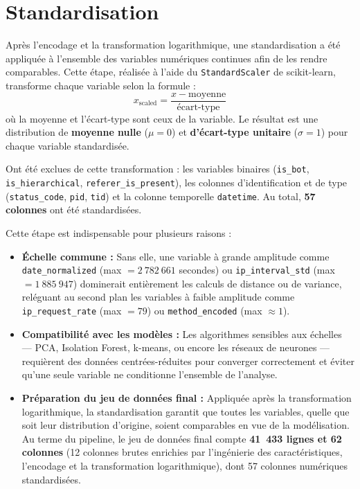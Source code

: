 \documentclass[a4paper,12pt]{article}
\begin{document}
\section{Standardisation}
\label{sec:standardisation}

Après l'encodage et la transformation logarithmique, une standardisation a été appliquée à l'ensemble des variables numériques continues afin de les rendre comparables. Cette étape, réalisée à l'aide du \texttt{StandardScaler} de scikit-learn, transforme chaque variable selon la formule :
\begin{equation}
  x_{\text{scaled}} = \frac{x - \text{moyenne}}{\text{écart-type}}
\end{equation}
où la moyenne et l'écart-type sont ceux de la variable. Le résultat est une distribution de \textbf{moyenne nulle} ($\mu = 0$) et \textbf{d'écart-type unitaire} ($\sigma = 1$) pour chaque variable standardisée.

Ont été exclues de cette transformation : les variables binaires (\texttt{is\_bot}, \texttt{is\_hierarchical}, \texttt{referer\_is\_present}), les colonnes d'identification et de type (\texttt{status\_code}, \texttt{pid}, \texttt{tid}) et la colonne temporelle \texttt{datetime}. Au total, \textbf{57 colonnes} ont été standardisées.

Cette étape est indispensable pour plusieurs raisons :
\begin{itemize}
  \item \textbf{Échelle commune :} Sans elle, une variable à grande amplitude comme \texttt{date\_normalized} (max $= 2~782~661$ secondes) ou \texttt{ip\_interval\_std} (max $= 1~885~947$) dominerait entièrement les calculs de distance ou de variance, reléguant au second plan les variables à faible amplitude comme \texttt{ip\_request\_rate} (max $= 79$) ou \texttt{method\_encoded} (max $\approx 1$).
  \item \textbf{Compatibilité avec les modèles :} Les algorithmes sensibles aux échelles --- PCA, Isolation Forest, k-means, ou encore les réseaux de neurones --- requièrent des données centrées-réduites pour converger correctement et éviter qu'une seule variable ne conditionne l'ensemble de l'analyse.
  \item \textbf{Préparation du jeu de données final :} Appliquée après la transformation logarithmique, la standardisation garantit que toutes les variables, quelle que soit leur distribution d'origine, soient comparables en vue de la modélisation. Au terme du pipeline, le jeu de données final compte \textbf{41~433 lignes et 62 colonnes} (12 colonnes brutes enrichies par l'ingénierie des caractéristiques, l'encodage et la transformation logarithmique), dont 57 colonnes numériques standardisées.
\end{itemize}
\end{document}
